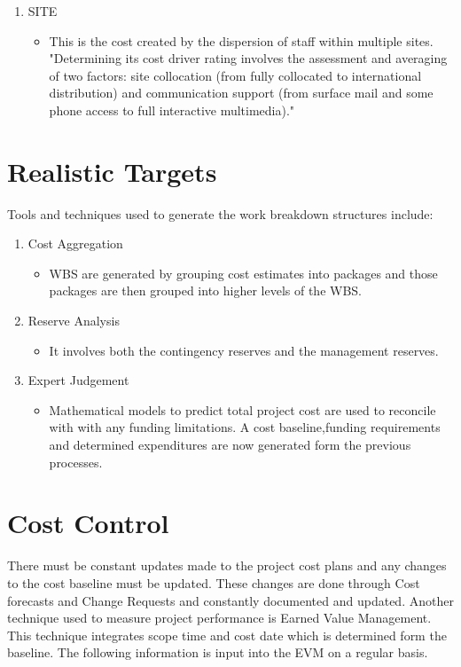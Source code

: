 \begin{enumerate}
\begin{itemize}
\end{itemize}
\item SITE
\begin{itemize}
\item This is the cost created by the dispersion of staff within multiple sites. "Determining its cost driver rating involves the assessment and averaging of two factors: site collocation (from fully collocated to international distribution) and communication support (from surface mail and some phone access to full interactive multimedia)." \parencite{coco}
\end{itemize}
\end{enumerate}





\section{Realistic Targets}

Tools and techniques used to generate the work breakdown structures include:
\begin{enumerate}
\item Cost Aggregation 
\begin{itemize}
\item WBS are generated by grouping cost estimates into packages and those packages are then grouped into higher levels of the WBS.
\end{itemize}
\item Reserve Analysis
\begin{itemize}
\item It involves both the contingency reserves and the management reserves. 
\end{itemize}
\item Expert Judgement
\begin{itemize}
\item Mathematical models to predict total project cost are used to reconcile with with any funding limitations. A cost baseline,funding requirements and determined expenditures are now generated form the previous processes.
\end{itemize}
\end{enumerate}

\section{Cost Control}

There must be constant updates made to the project cost plans and any changes to the cost baseline must be updated. These changes are done through Cost forecasts and Change Requests and constantly documented and updated. 
Another technique used to measure project performance is Earned Value Management. This technique integrates scope time and cost date which is determined form the baseline. The following information is input into the EVM on a regular basis.

